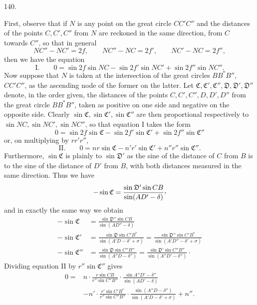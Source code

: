 \par{}\medskip
\begin{center}\hypertarget{native-187-article140}{}140.\end{center}
First, observe that if $N$ is any point on the great circle $CC'C''$ and the distances of the points $C,C',C''$ from $N$ are reckoned in the same direction, from $C$ towards $C''$, so that in general
\[
NC''-NC'=2f,\qquad NC''-NC=2f',\qquad NC'-NC=2f'',
\]
then we have the equation
\[
\text{I.}\qquad 0=\sin2f\sin NC-\sin2f'\sin NC'+\sin2f''\sin NC''.
\]
Now suppose that $N$ is taken at the intersection of the great circles $BB^*B''$, $CC'C''$, as the ascending node of the former on the latter. Let $\mathfrak{C},\mathfrak{C}',\mathfrak{C}'',\mathfrak{D},\mathfrak{D}',\mathfrak{D}''$ denote, in the order given, the distances of the points $C,C',C'',D,D',D''$ from the great circle $BB^*B''$, taken as positive on one side and negative on the opposite side. Clearly $\sin\mathfrak{C},\sin\mathfrak{C}',\sin\mathfrak{C}''$ are then proportional respectively to $\sin NC,\sin NC',\sin NC''$, so that equation I takes the form
\[
0=\sin2f\sin\mathfrak{C}-\sin2f'\sin\mathfrak{C}'+\sin2f''\sin\mathfrak{C}''
\]
or, on multiplying by $rr'r''$,
\hypertarget{native-188}{}
\[
\text{II.}\qquad 0=nr\sin\mathfrak{C}-n'r'\sin\mathfrak{C}'+n''r''\sin\mathfrak{C}''.
\]
Furthermore, $\sin\mathfrak{C}$ is plainly to $\sin\mathfrak{D}'$ as the sine of the distance of $C$ from $B$ is to the sine of the distance of $D'$ from $B$, with both distances measured in the same direction. Thus we have
\[
-\sin\mathfrak{C}=\frac{\sin\mathfrak{D}'\sin CB}{\sin(AD'-\delta)}\mathpunct{\raisebox{.45ex}{,}}
\]
and in exactly the same way we obtain
\[
\begin{aligned}
-\sin\mathfrak{C}&=\frac{\sin\mathfrak{D}''\sin CB}{\sin(AD''-\delta)}\\[.8ex]
-\sin\mathfrak{C}'&=\frac{\sin\mathfrak{D}\sin C'B^*}{\sin(A'D-\delta'+\sigma)}
=\frac{\sin\mathfrak{D}''\sin C'B^*}{\sin(A'D''-\delta'+\sigma)}\\[.8ex]
-\sin\mathfrak{C}''&=\frac{\sin\mathfrak{D}\sin C''B''}{\sin(A''D-\delta'')}
=\frac{\sin\mathfrak{D}'\sin C''B''}{\sin(A''D'-\delta'')}\mathpunct{\cdot}
\end{aligned}
\]
Dividing equation II by $r''\sin\mathfrak{C}''$ gives
\[
\begin{aligned}
0={}&n\cdot\frac{r\sin CB}{r''\sin C''B''}\cdot\frac{\sin A''D'-\delta''}{\sin(AD'-\delta)}\\[.8ex]
&-n'\cdot\frac{r'\sin C'B^*}{r''\sin C''B''}\cdot\frac{\sin(A''D-\delta'')}{\sin(A'D-\delta'+\sigma)}+n''.
\end{aligned}
\]
